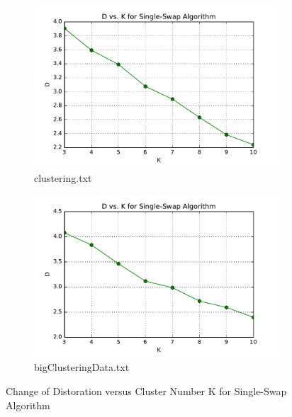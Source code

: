 \begin{description}
\begin{description}
\begin{figure}[H]
\centering
\centering
        \begin{subfigure}[b]{0.49\textwidth}
            \centering
            \includegraphics[width=\textwidth]{./figures/loss_clustering_singleSwap.pdf}
            \caption{clustering.txt}\label{fig:7a}
        \end{subfigure}
        \hfill
        \begin{subfigure}[b]{0.49\textwidth}  
            \centering 
            \includegraphics[width=\textwidth]{./figures/loss_bigClustering_singleSwap.pdf}
            \caption{bigClusteringData.txt}\label{fig:7b}
        \end{subfigure}
\caption{Change of Distoration versus Cluster Number K for Single-Swap Algorithm}
\label{fig:single-swap-loss} 
\end{figure}


\end{description}
\end{description}

